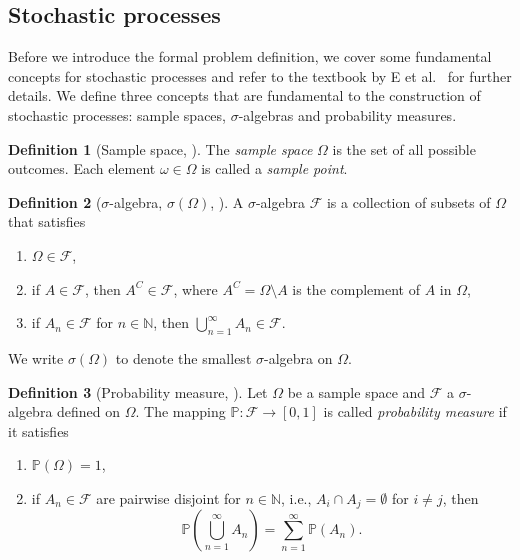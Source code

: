 \documentclass[12pt]{article}
\theoremstyle{definition}
\newtheorem{definition}[definition]{Definition}
\numberwithin{equation}{section}
\newcommand{\N}{\mathbb{N}}
\newcommand{\BP}{\mathbb{P}}
\newcommand{\CF}{\mathcal{F}}
\begin{document}
 \subsection{Stochastic processes}
 \label{subsec:stochastic_processes}
 Before we introduce the formal problem definition, we cover some fundamental concepts for stochastic processes and refer to the textbook by E et al.\ \cite{eAppliedStochasticAnalysis2021} for further details. We define three concepts that are fundamental to the construction of stochastic processes: sample spaces, $\sigma$-algebras and probability measures.
 \begin{definition}[Sample space,  ]
   The \emph{sample space} $\Omega$ is the set of all possible outcomes. Each element $\omega \in \Omega$ is called a \emph{sample point}.
 \end{definition}
 \begin{definition}[$\sigma$-algebra, $\sigma(\Omega)$, ]
   A $\sigma$-algebra $\CF$ is a collection of subsets of $\Omega$ that satisfies
   \begin{enumerate}[label=(\roman*)]
     \item $\Omega \in \CF$,
     \item if $A \in \CF$, then $A^C \in \CF$, where $A^C = \Omega \setminus A$ is the complement of $A$ in $\Omega$,
     \item if $A_n \in \CF$ for $n \in \N$, then $\bigcup_{n=1}^{\infty} A_n \in \CF$.
   \end{enumerate}
   We write $\sigma(\Omega)$ to denote the smallest $\sigma$-algebra on $\Omega$.
 \end{definition}
 \begin{definition}[Probability measure, ]
   Let $\Omega$ be a sample space and $\CF$ a $\sigma$-algebra defined on $\Omega$. The mapping $\BP : \CF \rightarrow [0,1]$ is called \emph{probability measure} if it satisfies
   \begin{enumerate}[label=(\roman*)]
     \item $\BP(\Omega) = 1$,
     \item if $A_n \in \CF$ are pairwise disjoint for $n\in\N$, i.e., $A_i \cap A_j = \emptyset$ for $i \neq j$, then
     \begin{equation*}
       \BP(\bigcup_{n=1}^{\infty}A_n) = \sum_{n=1}^{\infty}\BP(A_n).
     \end{equation*}
   \end{enumerate}
 \end{definition}
\end{document}
